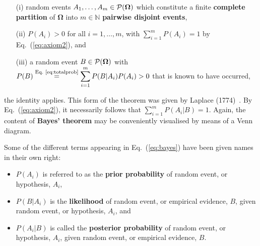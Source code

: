 %
\begin{itemize}

\item[(i)] random events $A_{1}, \ldots, A_{m} \in 
{\cal P}(\boldsymbol{\Omega})$ which constitute a finite
\textbf{complete partition} of $\boldsymbol{\Omega}$ into $m \in
\mathbb{N}$ \textbf{pairwise disjoint events},

\item[(ii)] $P(A_{i}) > 0$
for all $i = 1, \ldots, m$, with $\displaystyle
\sum_{i=1}^{m}P(A_{i}) = 1$ by Eq.~(\ref{eq:axiom2}), and

\item[(iii)] a random event $B \in {\cal P}(\boldsymbol{\Omega})$
with $\displaystyle 
P(B)\stackrel{\text{Eq.~\ref{eq:totalprob}}}{=}\sum_{i=1}^{m}
P(B|A_{i})P(A_{i}) > 0$ that is known to have occurred,

\end{itemize}
%
the identity
%
\be
{}
\ee
%
applies. This form of the theorem was given by Laplace
(1774)~. By Eq.~(\ref{eq:axiom2}), it necessarily
follows that $\displaystyle \sum_{i=1}^{m}P(A_{i}|B) = 1$. Again,
the content of \textbf{Bayes' theorem} may be conveniently
visualised by means of a Venn diagram.

\medskip
\noindent
Some of the different terms appearing in Eq.~(\ref{eq:bayes}) have 
been given names in their own right:
%
\begin{itemize}

\item $P(A_{i})$ is referred to as the \textbf{prior probability}
of random event, or hypothesis, $A_{i}$,

\item $P(B|A_{i})$ is the \textbf{likelihood} of random event,
or empirical evidence, $B$, given random event, or hypothesis,
$A_{i}$, and

\item $P(A_{i}|B)$ is called the \textbf{posterior probability} of 
random event, or hypothesis, $A_{i}$, given random event,
or empirical evidence, $B$.

\end{itemize}
%

